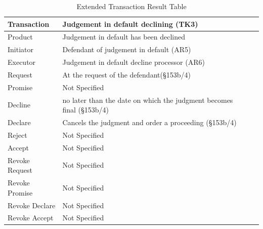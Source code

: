 \begin{landscape}
\begin{table}[h]
\caption{Extended Transaction Result Table}
\label{tab:etrt}
\begin{tabular}{|l||l|l|}
\hline
Transaction  & Judgement in default declining (TK3)  \\ \hline
Product      & Judgement in default has been declined  \\ \hline
Initiator      &  Defendant of judgement in default (AR5)   \\ \hline
Executor       &  Judgement in default decline processor (AR6) \\ \hline
Request        & At the request of the defendant(\S153b/4)   \\ \hline
Promise        &  Not Specified \\ \hline
Decline        &  no later than the date on which the judgment becomes final (\S153b/4) \\ \hline
Declare        & Cancels the judgment and order a proceeding (\S153b/4) \\ \hline
Reject         &  Not Specified   \\ \hline
Accept         & Not Specified \\ \hline
Revoke Request & Not Specified  \\ \hline
Revoke Promise & Not Specified  \\ \hline
Revoke Declare & Not Specified  \\ \hline
Revoke Accept  &  Not Specified  \\ \hline
\end{tabular}
\end{table}


\end{landscape}
